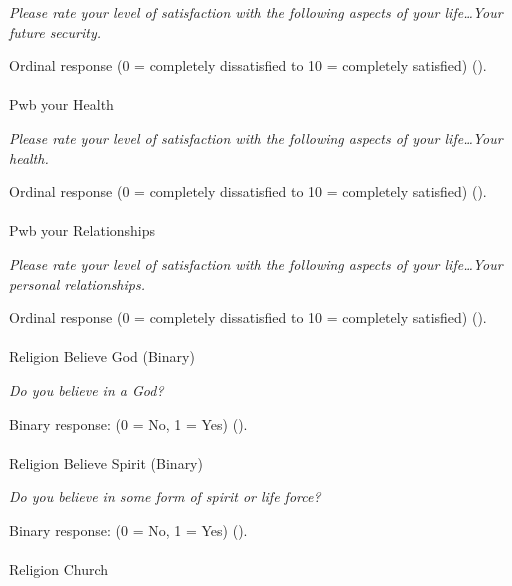 \documentclass[
  single column]{article}
\makeatletter
\let\oldparagraph\paragraph
\renewcommand{\paragraph}{
    \@ifstar
      \xxxParagraphStar
      \xxxParagraphNoStar
  }
\newcommand{\xxxParagraphStar}[1]{\oldparagraph*{#1}\mbox{}}
\newcommand{\xxxParagraphNoStar}[1]{\oldparagraph{#1}\mbox{}}
\makeatother
\begin{document}
\emph{Please rate your level of satisfaction with the following aspects
of your life\ldots Your future security.}

Ordinal response (0 = completely dissatisfied to 10 = completely
satisfied) ().

\paragraph{Pwb your Health}\label{pwb-your-health}

\emph{Please rate your level of satisfaction with the following aspects
of your life\ldots Your health.}

Ordinal response (0 = completely dissatisfied to 10 = completely
satisfied) ().

\paragraph{Pwb your Relationships}\label{pwb-your-relationships}

\emph{Please rate your level of satisfaction with the following aspects
of your life\ldots Your personal relationships.}

Ordinal response (0 = completely dissatisfied to 10 = completely
satisfied) ().

\paragraph{Religion Believe God
(Binary)}\label{religion-believe-god-binary}

\emph{Do you believe in a God?}

Binary response: (0 = No, 1 = Yes)
().

\paragraph{Religion Believe Spirit
(Binary)}\label{religion-believe-spirit-binary}

\emph{Do you believe in some form of spirit or life force?}

Binary response: (0 = No, 1 = Yes)
().

\paragraph{Religion Church}\label{religion-church}
\end{document}
